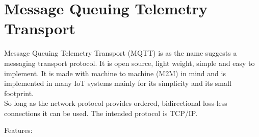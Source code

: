 \section{Message Queuing Telemetry Transport}
\label{sec:MQTT}

Message Queuing Telemetry Transport (MQTT) \cite{note:MQTT} is as the name suggests a messaging transport protocol. It is open source, light weight, simple and easy to implement. It is made with machine to machine (M2M) in mind and is implemented in many IoT systems mainly for its simplicity and its small footprint.\\

So long as the network protocol provides ordered, bidirectional loss-less connections it can be used. The intended protocol is TCP/IP.

Features:


